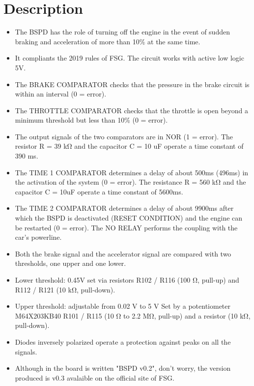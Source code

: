 \documentclass[a4paper,12pt,oneside,pdflatex,italian,final]{article}
\begin{document}
\section{Description}
\begin{itemize}
    
\item  The BSPD has the role of turning off the engine in the event of sudden braking and
acceleration of more than 10\% at the same time.
\item  It compliants the 2019 rules of FSG.
The circuit works with active low logic 5V.
\item  The BRAKE COMPARATOR checks that the pressure in the brake circuit is within an interval
(0 = error).
\item  The THROTTLE COMPARATOR checks that the throttle is open beyond a minimum
threshold but less than 10\% (0 = error).
\item The output signals of the two comparators are in NOR (1 = error).
The resistor R = 39 k\si{\ohm} and the capacitor C = 10 uF operate a time constant of 390 ms.
\item  The TIME 1 COMPARATOR determines a delay of about 500ms (496ms) in the activation of the system (0 = error).
The resistance R = 560 k\si{\ohm} and the capacitor C = 10uF operate a time constant of 5600ms.
\item  The TIME 2 COMPARATOR determines a delay of about 9900ms after which the BSPD is
deactivated (RESET CONDITION) and the engine can be restarted (0 = error).
The NO RELAY performs the coupling with the car's powerline.
\item Both the brake signal and the accelerator signal are compared with two
thresholds, one upper and one lower.
\item Lower threshold: 0.45V set via resistors R102 / R116 (100 \si{\ohm}, pull-up) and R112 / R121 (10 k\si{\ohm}, pull-down).
\item Upper threshold: adjustable from 0.02 V to 5 V Set by a potentiometer M64X203KB40 R101 / R115 (10 \si{\ohm} to 2.2 M\si{\ohm}, pull-up) and a resistor (10 k\si{\ohm}, pull-down).
\item  Diodes inversely polarized operate a protection against peaks on all the signals.
\item  Although in the board is written "BSPD v0.2", don't worry, the version produced is v0.3 avalaible on the official site of FSG.
\end{itemize}
\end{document}
